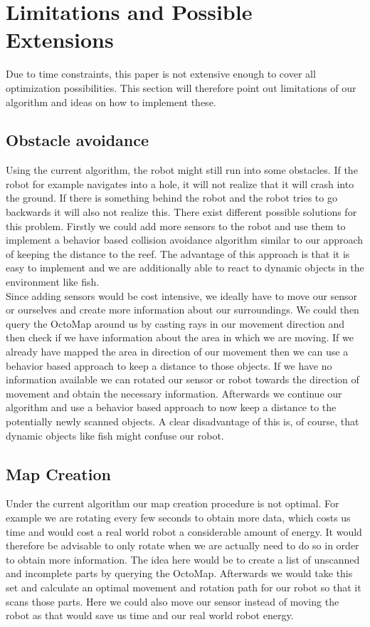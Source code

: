 \documentclass[twoside, 12pt]{article}
\begin{document}
\section{Limitations and Possible Extensions}
\label{sec:limitations}
Due to time constraints, this paper is not extensive enough to cover all optimization possibilities. This section will therefore point out limitations of our algorithm and ideas on how to implement these.

\subsection{Obstacle avoidance}
Using the current algorithm, the robot might still run into some obstacles. If the robot for example navigates into a hole, it will not realize that it will crash into the ground. If there is something behind the robot and the robot tries to go backwards it will also not realize this. There exist different possible solutions for this problem. Firstly we could add more sensors to the robot and use them to implement a behavior based collision avoidance algorithm similar to our approach of keeping the distance to the reef. The advantage of this approach is that it is easy to implement and we are additionally able to react to dynamic objects in the environment like fish.\\

Since adding sensors would be cost intensive, we ideally have to move our sensor or ourselves and create more information about our surroundings. We could then query the OctoMap around us by casting rays in our movement direction and then check if we have information about the area in which we are moving. If we already have mapped the area in direction of our movement then we can use a behavior based approach to keep a distance to those objects. If we have no information available we can rotated our sensor or robot towards the direction of movement and obtain the necessary information. Afterwards we continue our algorithm and use a behavior based approach to now keep a distance to the potentially newly scanned objects. A clear disadvantage of this is, of course, that dynamic objects like fish might confuse our robot.\\

\subsection{Map Creation}
Under the current algorithm our map creation procedure is not optimal. For example we are rotating every few seconds to obtain more data, which costs us time and would cost a real world robot a considerable amount of energy. It would therefore be advisable to only rotate when we are actually need to do so in order to obtain more information. The idea here would be to create a list of unscanned and incomplete parts by querying the OctoMap. Afterwards we would take this set and calculate an optimal movement and rotation path for our robot so that it scans those parts. Here we could also move our sensor instead of moving the robot as that would save us time and our real world robot energy.\\
\end{document}

